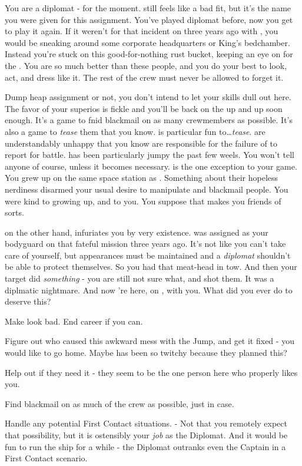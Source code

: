\documentclass[char]{TMFHope}
\begin{document}
\name{\cDip{}}

You are a diplomat - for the moment. \cDip{} still feels like a bad fit, but it's the name you were given for this assignment. You've played diplomat before, now you get to play it again. If it weren't for that incident on \pHome{} three years ago with \cWeap{}, you would be sneaking around some corporate headquarters or King's bedchamber. Instead you're stuck on this good-for-nothing rust bucket, keeping an eye on \cXO{} for the \pPlan{}. You are so much better than these people, and you do your best to look, act, and dress like it. The rest of the crew must never be allowed to forget it.

Dump heap assignment or not, you don't intend to let your skills dull out here. The favor of your superios is fickle and you'll be back on the up and up soon enough. It's a game to fnid blackmail on as many crewmembers as possible. It's also a game to \emph{tease} them that you know. \cXO{} is particular fun to\ldots \emph{tease}. \cXO{\They} are understandably unhappy that you know \cXO{\they} are responsible for the failure of \pOld{} to report for battle. \cXO{} has been particularly jumpy the past few weels. You won't tell anyone of course, unless it becomes necessary. \cMed{} is the one exception to your game. You grew up on the same space station as \cMed{\them}. Something about their hopeless nerdiness disarmed your usual desire to manipulate and blackmail people. You were kind to \cMed{\them} growing up, and \cMed{\they} to you. You suppose that makes you friends of sorts. 

\cWeap{} on the other hand, infuriates you by \cWeap{\their} very existence. \cWeap{} was assigned as your bodyguard on that fateful mission three years ago. It's not like you can't take care of yourself, but appearances must be maintained and a \emph{diplomat} shouldn't be able to protect themselves. So you had that meat-head in tow. And then your target did \emph{something} - you are still not sure what, and \cWeap{} shot them. It was a diplmatic nightmare. And now \cWeap{\they}'re here, on \pNew{}, with you. What did you ever do to deserve this?

\begin{itemz}[Goals]
	\item Make \cWeap{} look bad. End \cWeap{\their} career if you can.
	\item Figure out who caused this awkward mess with the Jump, and get it fixed - you would like to go home. Maybe \cXO{} has been so twitchy because they planned this?
	\item Help \cMed{} out if they need it - they seem to be the one person here who properly likes you.
	\item Find blackmail on as much of the crew as possible, just in case.
	\item Handle any potential First Contact situations. - Not that you remotely expect that possibility, but it is ostensibly your \emph{job} as the Diplomat. And it would be fun to run the ship for a while - the Diplomat outranks even the Captain in a First Contact scenario.
\end{itemz}
\end{document}
